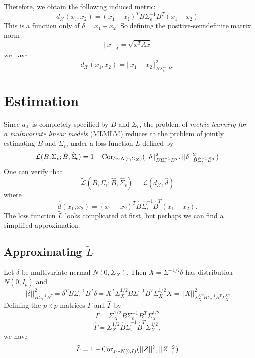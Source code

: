 \documentclass[12pt]{article}
\begin{document}
Therefore, we obtain the following induced metric:
\[
d_\mathcal{X}(x_1,x_2) = (x_1-x_2)^T B \Sigma_\epsilon^{-1} B^T (x_1 - x_2)
\]
This is a function only of $\delta = x_1 - x_2$.
So defining the
positive-semidefinite matrix norm
\[
||x||_A = \sqrt{x^T A x}
\]
we have
\[
d_\mathcal{X}(x_1,x_2) = ||x_1 - x_2||^2_{B\Sigma_\epsilon^{-1}B^T}
\]

\section{Estimation}

Since $d_\mathcal{X}$ is completely specified by $B$ and
$\Sigma_\epsilon$, the problem of \emph{metric
learning for a multivariate linear models} (MLMLM) reduces to the
problem of jointly estimating $B$ and $\Sigma_\epsilon$, under a loss
function $\tilde{L}$ defined by
\[
\tilde{\mathcal{L}}(B, \Sigma_\epsilon; \hat{B}, \hat{\Sigma}_\epsilon) = 
1 - \text{Cor}_{\delta \sim N(0, \Sigma_X)}(||\delta||^2_{B\Sigma_\epsilon^{-1}B^T},
||\delta||^2_{\hat{B}\hat{\Sigma}_\epsilon^{-1}\hat{B}^T})
\]
One can verify that
\[
\tilde{\mathcal{L}}(B, \Sigma_\epsilon; \hat{B}, \hat{\Sigma}_\epsilon) 
= \mathcal{L}(d_\mathcal{X}, \hat{d})
\]
where
\[
\hat{d}(x_1, x_2) =  (x_1-x_2)^T \hat{B} \hat{\Sigma}_\epsilon^{-1} \hat{B}^T (x_1 - x_2).
\]
The loss function $\tilde{L}$ looks complicated at first,
but perhaps we can find a simplified approximation.

\subsection{Approximating $\tilde{L}$}

Let $\delta$ be multivariate normal $N(0, \Sigma_X)$.
Then $X = \Sigma^{-1/2}\delta$ has distribution $N(0, I_p)$
and
\[
||\delta||^2_{B\Sigma_\epsilon^{-1}B^T}
= \delta^T B\Sigma_\epsilon^{-1}B^T \delta
= X^T \Sigma_X^{1/2}B\Sigma_\epsilon^{-1}B^T \Sigma_X^{1/2} X
= ||X||^2_{\Sigma_X^{1/2}B\Sigma_\epsilon^{-1}B^T \Sigma_X^{1/2}}
\]
Defining the $p \times p$ matrices $\Gamma$ and $\hat{\Gamma}$ by
\[\Gamma = \Sigma_X^{1/2}B\Sigma_\epsilon^{-1}B^T \Sigma_X^{1/2}\]
\[\hat{\Gamma}
 = \Sigma_X^{1/2}\hat{B}\hat{\Sigma}_\epsilon^{-1}\hat{B}^T \Sigma_X^{1/2},\]
we have
\[
\tilde{L} = 
1 - \text{Cor}_{z \sim N(0, I)}(||Z||^2_\Gamma, ||Z||^2_{\hat{\Gamma}})
\]
\end{document}

